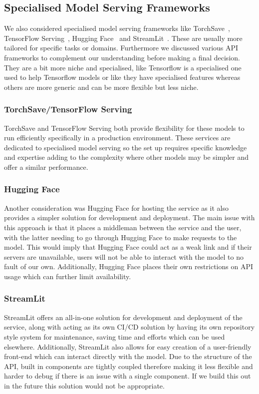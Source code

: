 \documentclass{surreydissertation}
\begin{document}
\subsection{Specialised Model Serving Frameworks}
We also considered specialised model serving frameworks like TorchSave~\cite{TorchSave}, TensorFlow Serving~\cite{tensorflow}, Hugging Face~\cite{huggingface} and StreamLit~\cite{streamlit}. These are usually more tailored for specific tasks or domains. Furthermore we discussed various API frameworks to complement our understanding before making a final decision. 
They are a bit more niche and specialised, like Tensorflow is a specialised one used to help Tensorflow models or like they have specialised features whereas others are more generic and can be more flexible but less niche. 

\subsubsection{TorchSave/TensorFlow Serving}
TorchSave and TensorFlow Serving both provide flexibility for these models to run efficiently specifically in a production environment. These services are dedicated to specialised model serving so the set up requires specific knowledge and expertise adding to the complexity where other models may be simpler and offer a similar performance.

\subsubsection{Hugging Face}
Another consideration was Hugging Face for hosting the service as it also provides a simpler solution for development and deployment. The main issue with this approach is that it places a middleman between the service and the user, with the latter needing to go through Hugging Face to make requests to the model. This would imply that Hugging Face could act as a weak link and if their servers are unavailable, users will not be able to interact with the model to no fault of our own. Additionally, Hugging Face places their own restrictions on API usage which can further limit availability.

\subsubsection{StreamLit}
StreamLit offers an all-in-one solution for development and deployment of the service, along with acting as its own CI/CD solution by having its own repository style system for maintenance, saving time and efforts which can be used elsewhere. Additionally, StreamLit also allows for easy creation of a user-friendly front-end which can interact directly with the model. Due to the structure of the API, built in components are tightly coupled therefore making it less flexible and harder to debug if there is an issue with a single component. If we build this out in the future this solution would not be appropriate.
\end{document}

